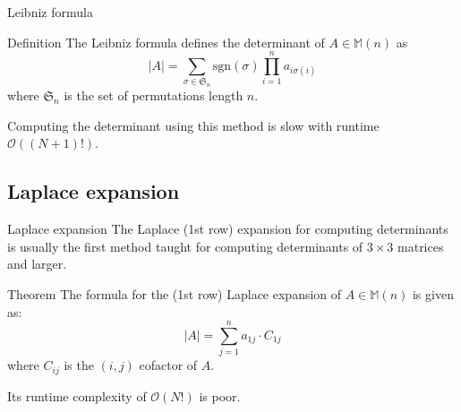 \documentclass{beamer}
\begin{document}
\begin{frame}{Leibniz formula}
    \begin{block}{Definition}
        The Leibniz formula defines the determinant of $A \in \mathbb{M}(n)$ as
        \[
            |A| = \sum_{\sigma \in \mathfrak{S}_n} \mathrm{sgn}(\sigma)
            \prod_{i=1}^n a_{i \sigma(i)}
        \]
        where $\mathfrak{S}_n$ is the set of permutations length $n$.
    \end{block}

    Computing the determinant using this method is slow with runtime $\mathcal{O}((N+1)!)$.
\end{frame}

\subsection{Laplace expansion}

\begin{frame}{Laplace expansion}
    The Laplace (1st row) expansion for computing determinants is usually the first method taught
    for computing determinants of $3 \times 3$ matrices and larger.

    \begin{block}{Theorem}
        The formula for the (1st row) Laplace expansion of $A \in \mathbb{M}(n)$
        is given as:
        \[
            |A| = \sum_{j=1}^n a_{1j}\cdot C_{1j}
        \]
        where $C_{ij}$ is the $(i, j)$ cofactor of $A$.
    \end{block}

    Its runtime complexity of $\mathcal{O}(N!)$ is poor.

\end{frame}
\end{document}
